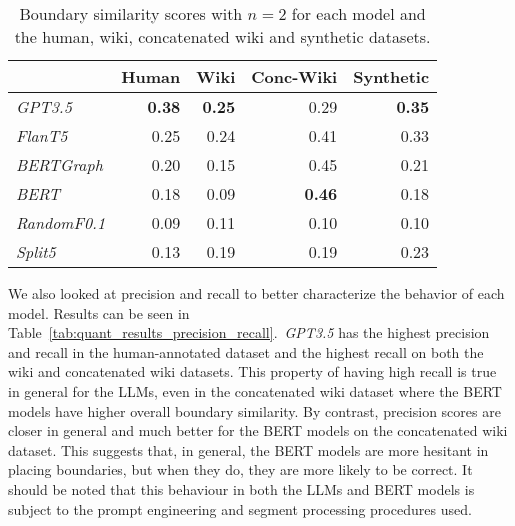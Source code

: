 \begin{table}[ht]
    \centering
    \begin{tabular}{@{}lrrrr@{}}
    \toprule
    & Human & Wiki & Conc-Wiki & Synthetic \\ \midrule
    \it GPT3.5  & \bf 0.38 & \bf 0.25 & 0.29 & \bf 0.35 \\ 
    \it FlanT5  & 0.25 & 0.24 & 0.41 & 0.33 \\ 
    \midrule
    \it BERTGraph & 0.20 & 0.15 & 0.45 & 0.21 \\ 
    \it BERT & 0.18 & 0.09 & \bf 0.46 & 0.18 \\
    \it RandomF0.1& 0.09 & 0.11 & 0.10 & 0.10 \\
    \it Split5 & 0.13 & 0.19 & 0.19 & 0.23 \\
    \bottomrule
    \end{tabular}
    \caption{Boundary similarity scores with $n=2$ for each model and the human, wiki, concatenated wiki and synthetic datasets.}\label{tab:quant_results}
    \end{table}

We also looked at precision and recall to better characterize the behavior of each model. Results can be seen in Table~\ref{tab:quant_results_precision_recall}.\ \emph{GPT3.5} has the highest precision and recall in the human-annotated dataset and the highest recall on both the wiki and concatenated wiki datasets. This property of having high recall is true in general for the LLMs, even in the concatenated wiki dataset where the BERT models have higher overall boundary similarity. By contrast, precision scores are closer in general and much better for the BERT models on the concatenated wiki dataset. This suggests that, in general, the BERT models are more hesitant in placing boundaries, but when they do, they are more likely to be correct. It should be noted that this behaviour in both the LLMs and BERT models is subject to the prompt engineering and segment processing procedures used.

